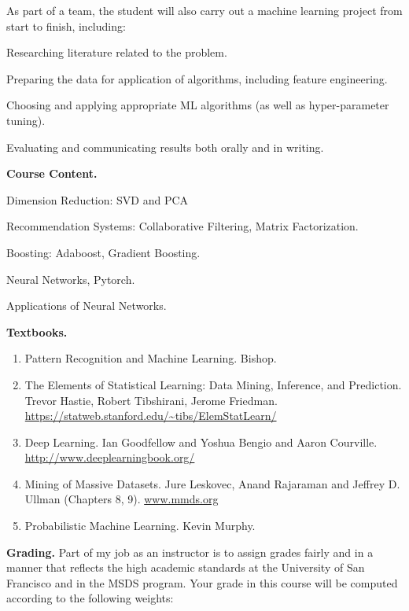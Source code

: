 \documentclass[11pt]{article}
\newenvironment{itemize*}%
  {\begin{itemize}%
    \setlength{\itemsep}{0pt}%
    \setlength{\parskip}{0pt}}%
  {\end{itemize}}
\begin{document}
\noindent As part of a team, the student will also carry out a machine learning project from start to finish, including:
\begin{itemize*}
\item Researching literature related to the problem.
\item Preparing the data for application of algorithms, including feature engineering.
\item Choosing and applying  appropriate ML algorithms (as well as hyper-parameter tuning).
\item Evaluating and communicating results both orally and in writing.
\end{itemize*}


\noindent \textbf{Course Content.} 

\vspace{-0.05in}

\begin{itemize*}
\item Dimension Reduction: SVD and PCA
\item Recommendation Systems: Collaborative Filtering, Matrix Factorization.
\item Boosting: Adaboost, Gradient Boosting.
\item Neural Networks, Pytorch.
\item Applications of Neural Networks.
\end{itemize*}



\noindent \noindent \textbf{Textbooks.} \\
\vspace{-0.15in}
\begin{enumerate}
\item Pattern Recognition and Machine Learning. Bishop. 
\item The Elements of Statistical Learning: Data Mining, Inference, and Prediction. Trevor Hastie, Robert Tibshirani, Jerome Friedman. \url{https://statweb.stanford.edu/~tibs/ElemStatLearn/} 
\item Deep Learning. Ian Goodfellow and Yoshua Bengio and Aaron Courville.  \url{http://www.deeplearningbook.org/}
\item Mining of Massive Datasets. Jure Leskovec, Anand Rajaraman and Jeffrey D. Ullman (Chapters 8, 9). \url{www.mmds.org}
\item  Probabilistic Machine Learning. Kevin Murphy.
\end{enumerate}

\noindent \textbf{Grading.} Part of my job as an instructor is to assign grades fairly and in a manner that reflects the high academic standards at the University of San Francisco and in the MSDS program. Your grade in this course will be computed according to the following weights:\\
\end{document}
